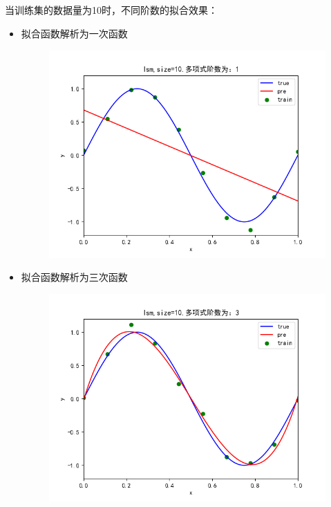 \documentclass[lang=cn,a4paper,cite=authoryear]{elegantpaper}
\begin{document}
\subsection*{}
当训练集的数据量为10时，不同阶数的拟合效果：
\begin{itemize}
	\item 拟合函数解析为一次函数
	\begin{figure}[H]
		\centering
		\includegraphics[scale=0.5]{1}
	\end{figure}
	\item 拟合函数解析为三次函数
	\begin{figure}[H]
		\centering
		\includegraphics[scale=0.5]{3}
	\end{figure}

\end{itemize}
\end{document}
